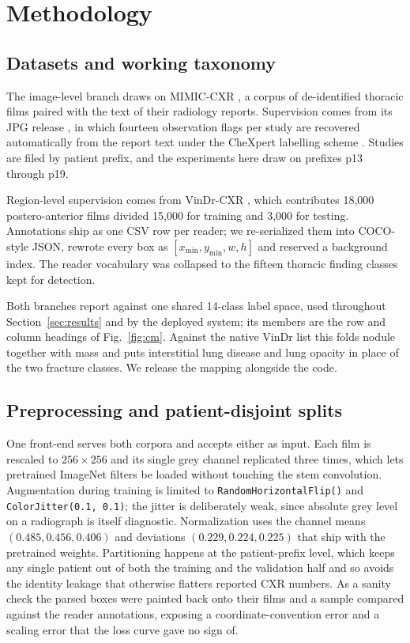 \documentclass[conference]{IEEEtran}
\begin{document}
\section{Methodology}

\subsection{Datasets and working taxonomy}

The image-level branch draws on MIMIC-CXR \cite{johnson2019mimic}, a corpus of
de-identified thoracic films paired with the text of their radiology reports.
Supervision comes from its JPG release \cite{johnson2019jpg}, in which fourteen
observation flags per study are recovered automatically from the report text
under the CheXpert labelling scheme \cite{irvin2019}. Studies are filed by
patient prefix, and the experiments here draw on prefixes p13 through p19.

Region-level supervision comes from VinDr-CXR \cite{nguyen2022}, which
contributes 18,000 postero-anterior films divided 15,000 for training and 3,000
for testing. Annotations ship as one CSV row per reader; we re-serialized them
into COCO-style JSON, rewrote every box as $[x_{\min}, y_{\min}, w, h]$ and
reserved a background index. The reader vocabulary was collapsed to the fifteen
thoracic finding classes kept for detection.

Both branches report against one shared 14-class label space, used throughout
Section~\ref{sec:results} and by the deployed system; its members are the row and
column headings of Fig.~\ref{fig:cm}. Against the native
VinDr list this folds nodule together with mass and puts interstitial lung
disease and lung opacity in place of the two fracture classes. We release the
mapping alongside the code.

\subsection{Preprocessing and patient-disjoint splits}

One front-end serves both corpora and accepts either as input. Each film is
rescaled to $256 \times 256$ and its single grey channel replicated three times,
which lets pretrained ImageNet filters be loaded without touching the stem
convolution. Augmentation during training is limited to
\texttt{RandomHorizontalFlip()} and \texttt{ColorJitter(0.1, 0.1)}; the jitter
is deliberately weak, since absolute grey level on a radiograph is itself
diagnostic. Normalization uses the channel means $(0.485, 0.456, 0.406)$ and
deviations $(0.229, 0.224, 0.225)$ that ship with the pretrained weights. Partitioning
happens at the patient-prefix level, which keeps any single patient out of both
the training and the validation half and so avoids the identity leakage that
otherwise flatters reported CXR numbers. As a sanity check the parsed boxes
were painted back onto their films and a sample compared against the reader
annotations, exposing a coordinate-convention error and a scaling error that
the loss curve gave no sign of.
\end{document}
